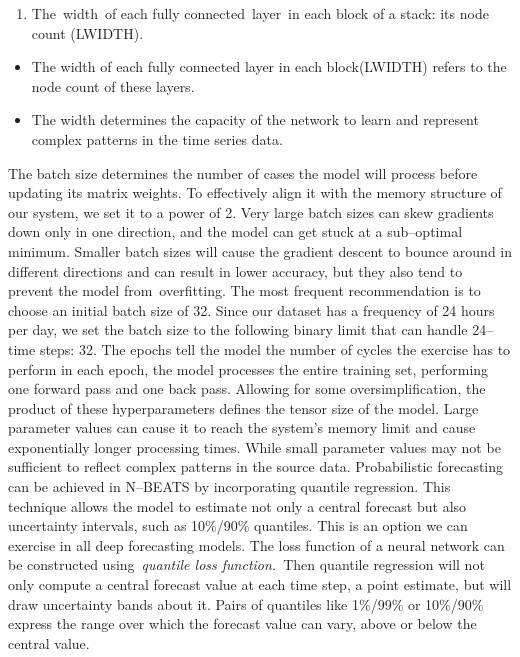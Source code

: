 \documentclass[12pt,a4paper]{report}
\numberwithin{equation}{section}
\begin{document}
\begin{enumerate}
\def\labelenumi{\roman{enumi}.}
\setcounter{enumi}{2}
\item
  The~width~of each fully connected~layer~in each block of a stack: its
  node count (LWIDTH).
\end{enumerate}

\begin{itemize}
\item
  The width of each fully connected layer in each block(LWIDTH) refers
  to the node count of these layers.
\item
  The width determines the capacity of the network to learn and
  represent complex patterns in the time series data.
\end{itemize}

The batch size determines the number of cases the model will process
before updating its matrix weights. To effectively align it with the
memory structure of our system, we set it to a power of 2. Very large
batch sizes can skew gradients down only in one direction, and the model
can get stuck at a sub--optimal minimum. Smaller batch sizes will cause
the gradient descent to bounce around in different directions and can
result in lower accuracy, but they also tend to prevent the model
from~overfitting. The most frequent recommendation is to choose an
initial batch size of 32. Since our dataset has a frequency of 24 hours
per day, we set the batch size to the following binary limit that can
handle 24--time steps: 32. The epochs tell the model the number of cycles
the exercise has to perform in each epoch, the model processes the
entire training set, performing one forward pass and one back pass.
Allowing for some oversimplification, the product of these
hyperparameters defines the tensor size of the model. Large parameter
values \hspace{0pt}\hspace{0pt}can cause it to reach the system's memory
limit and cause exponentially longer processing times. While small
parameter values \hspace{0pt}\hspace{0pt}may not be sufficient to
reflect complex patterns in the source data. Probabilistic forecasting
can be achieved in N--BEATS by incorporating quantile regression. This
technique allows the model to estimate not only a central forecast but
also uncertainty intervals, such as 10\%/90\% quantiles. This is an
option we can exercise in all deep forecasting models. The loss function
of a neural network can be constructed using~\emph{quantile loss
function.}~Then quantile regression will not only compute a central
forecast value at each time step, a point estimate, but will draw
uncertainty bands about it. Pairs of quantiles like 1\%/99\% or
10\%/90\% express the range over which the forecast value can vary,
above or below the central value.
\end{document}

